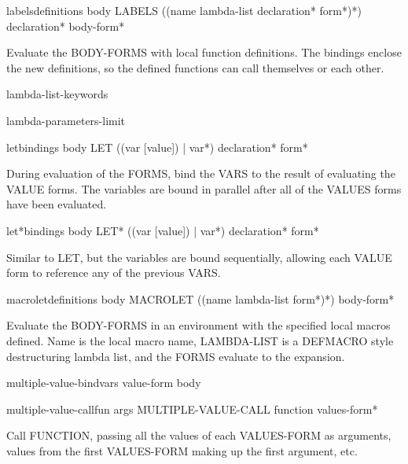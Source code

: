 \begin{specialop}{labels}{definitions \body body}{}
  LABELS ({(name lambda-list declaration* form*)}*) declaration* body-form*

Evaluate the BODY-FORMS with local function definitions. The bindings enclose
the new definitions, so the defined functions can call themselves or each
other.
\end{specialop}

\begin{constant}{lambda-list-keywords}{}{}
  
\end{constant}

\begin{constant}{lambda-parameters-limit}{}{}
  
\end{constant}

\begin{specialop}{let}{bindings \body body}{}
  LET ({(var [value]) | var}*) declaration* form*

During evaluation of the FORMS, bind the VARS to the result of evaluating the
VALUE forms. The variables are bound in parallel after all of the VALUES forms
have been evaluated.
\end{specialop}

\begin{specialop}{let*}{bindings \body body}{}
  LET* ({(var [value]) | var}*) declaration* form*

Similar to LET, but the variables are bound sequentially, allowing each VALUE
form to reference any of the previous VARS.
\end{specialop}

\begin{specialop}{macrolet}{definitions \rest body}{}
  MACROLET ({(name lambda-list form*)}*) body-form*

Evaluate the BODY-FORMS in an environment with the specified local macros
defined. Name is the local macro name, LAMBDA-LIST is a DEFMACRO style
destructuring lambda list, and the FORMS evaluate to the expansion.
\end{specialop}

\begin{macro}{multiple-value-bind}{vars value-form \body body}{}
  
\end{macro}

\begin{specialop}{multiple-value-call}{fun \rest args}{}
  MULTIPLE-VALUE-CALL function values-form*

Call FUNCTION, passing all the values of each VALUES-FORM as arguments,
values from the first VALUES-FORM making up the first argument, etc.
\end{specialop}

